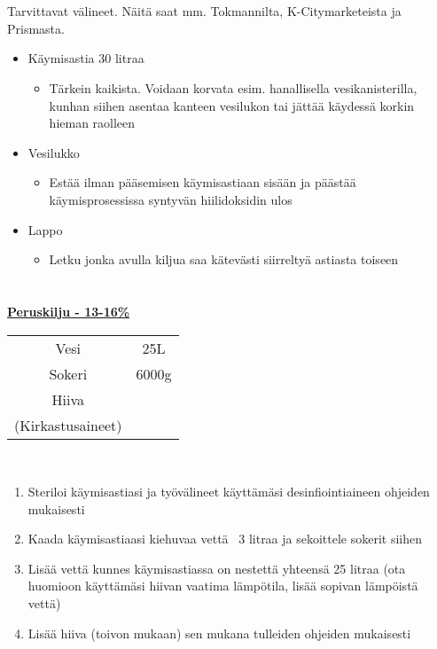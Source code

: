 \documentclass[20pt, a4]{article}
\begin{document}
{    \section{}
    Tarvittavat välineet. 
    Näitä saat mm. Tokmannilta, K-Citymarketeista ja Prismasta.\\
    \begin{itemize}    
        \item Käymisastia 30 litraa
            \begin{itemize}
                \item Tärkein kaikista. Voidaan korvata esim. hanallisella vesikanisterilla, kunhan siihen asentaa kanteen vesilukon tai jättää käydessä korkin hieman raolleen
            \end{itemize}
        \item Vesilukko
            \begin{itemize}
                \item Estää ilman pääsemisen käymisastiaan sisään ja päästää käymisprosessissa syntyvän hiilidoksidin ulos
            \end{itemize}
        \item Lappo
            \begin{itemize}
                \item Letku jonka avulla kiljua saa kätevästi siirreltyä astiasta toiseen
            \end{itemize}
    \end{itemize}

    \pagebreak
    \section{}
    \underline{\textbf{Peruskilju - 13-16\%}}
    \\
    \begin{tabular}{ cc } 

        Vesi & 25L \\
        Sokeri & 6000g\\
        Hiiva&\\
        (Kirkastusaineet)&\\
    \end{tabular}
    \\

    \begin{enumerate}
     \item Steriloi käymisastiasi ja työvälineet käyttämäsi desinfiointiaineen ohjeiden mukaisesti
     \item Kaada käymisastiaasi kiehuvaa vettä ~3 litraa ja sekoittele sokerit siihen
     \item Lisää vettä kunnes käymisastiassa on nestettä yhteensä 25 litraa (ota huomioon käyttämäsi hiivan vaatima lämpötila, lisää sopivan lämpöistä vettä)
     \item Lisää hiiva (toivon mukaan) sen mukana tulleiden ohjeiden mukaisesti


\end{enumerate}}
\end{document}
